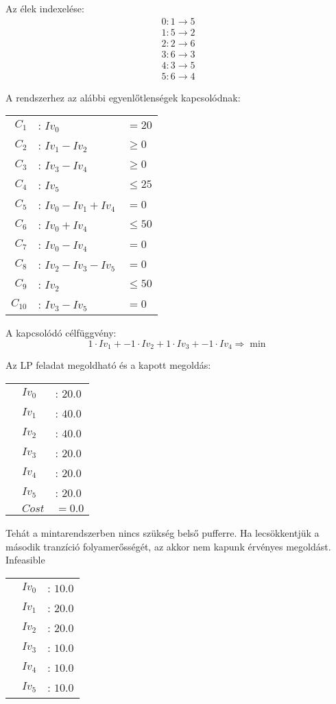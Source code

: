 \documentclass[12pt,a4paper]{book}
\begin{document}
Az élek indexelése:
\begin{align*}
0  :  1 \rightarrow 5  \\
1  :  5 \rightarrow 2  \\
2  :  2 \rightarrow 6  \\
3  :  6 \rightarrow 3  \\
4  :  3 \rightarrow 5  \\
5  :  6 \rightarrow 4 
\end{align*}

A rendszerhez az alábbi egyenlőtlenségek kapcsolódnak:

\begin{center}
\begin{tabular}{rll}
$C_1$ &: $Iv_0$ &$= 20$ \\
$C_2$ &: $Iv_1 - Iv_2$ &$\geq 0$\\
$C_3$ &: $Iv_3 - Iv_4$ &$\geq 0$\\
$C_4$ &: $Iv_5$ &$\leq 25$\\
$C_5$ &: $Iv_0 - Iv_1 + Iv_4$ &$= 0$\\
$C_6$ &: $Iv_0 + Iv_4 $&$\leq 50$\\
$C_7$ &: $Iv_0 - Iv_4 $&$= 0$\\
$C_8$ &: $Iv_2 - Iv_3 - Iv_5$&$= 0$\\
$C_9$ &: $Iv_2 $&$\leq 50$\\
$C_{10}$ &: $Iv_3 - Iv_5 $&$= 0$
\end{tabular}
\end{center}

A kapcsolódó célfüggvény:
$$1\cdot Iv_1 + -1\cdot Iv_2 + 1\cdot Iv_3 + -1\cdot Iv_4\Rightarrow \min$$

Az LP feladat megoldható és a kapott megoldás:
\begin{center}
\begin{tabular}{rll}
&$Iv_0$ &: $20.0$\\
&$Iv_1$ &: $40.0$\\
&$Iv_2$ &: $40.0$\\
&$Iv_3$ &: $20.0$\\
&$Iv_4$ &: $20.0$\\
&$Iv_5$ &: $20.0$\\
&$Cost$ & $= 0.0$
\end{tabular}
\end{center}
Tehát a mintarendszerben nincs szükség belső pufferre. 
Ha lecsökkentjük a második tranzíció folyamerősségét, az akkor nem kapunk érvényes megoldást. \\
Infeasible
\begin{center}
\begin{tabular}{rll}
&$Iv_0$ &: $10.0$\\
&$Iv_1$ &: $20.0$\\
&$Iv_2$ &: $20.0$\\
&$Iv_3$ &: $10.0$\\
&$Iv_4$ &: $10.0$\\
&$Iv_5$ &: $10.0$
\end{tabular}
\end{center}
\end{document}
